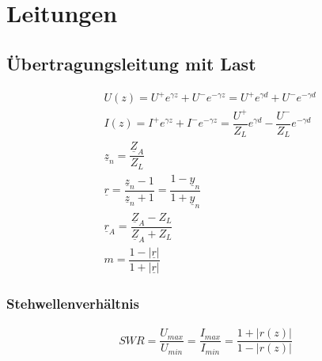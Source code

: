\section{Leitungen}
\subsection{Übertragungsleitung mit Last}
\begin{align*}
     & U(z) = U^+ e^{\gamma z} + U^- e^{-\gamma z} = U^+ e^{\gamma d} + U^ - e^{-\gamma d}                        \\
     & I(z) = I^+ e^{\gamma z} + I^- e^{-\gamma z} = \dfrac{U^+}{Z_L}e^{\gamma d} - \dfrac{U^-}{Z_L}e^{-\gamma d} \\
     & \underline{z}_n = \dfrac{\underline{Z}_A}{Z_L}                                                             \\
     & \underline{r} = \dfrac{\underline{z}_n-1}{\underline{z}_n+1}= \dfrac{1-\underline{y}_n}{1+\underline{y}_n} \\
     & \underline{r}_A = \dfrac{\underline{Z}_A-Z_L}{\underline{Z}_A+Z_L}                                         \\
     & m = \dfrac{1-|\underline{r}|}{1+|\underline{r}|}
\end{align*}
\subsubsection{Stehwellenverhältnis}
\begin{align*}
    SWR = \dfrac{U_{max}}{U_{min}} = \dfrac{I_{max}}{I_{min}} = \dfrac{1+|r(z)|}{1-|r(z)|}
\end{align*}
